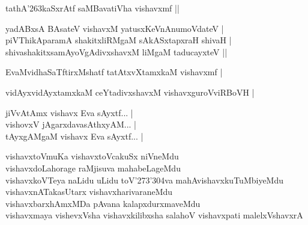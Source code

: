 \begin{entry}
\begin{shl}
tathA{\char'263}kaSxrAtf saMBavatiVha vishavxmf ||
\end{shl}
\begin{shl}
yadABxsA BAsateV vishavxM yatusxKeVnAnumoVdateV |\\
piVThikAparamA shakitxliRMgaM sAkASxtapxraH shivaH |\\
shivashakitxsamAyoVgAdivxshavxM liMgaM taducayxteV ||
\end{shl}
\begin{shl}
EvaMvidhaSaTftirxMshatf tatAtxvXtamxkaM vishavxmf |
\end{shl}
\begin{shl}
vidAyxvidAyxtamxkaM ceYtadivxshavxM vishavxguroVviRBoVH |
\end{shl}
\end{entry}

\begin{entry}
\begin{shl}
jiVvAtAmx vishavx Eva sAyxtf... |\\
vishovxV jAgarxdavasAthxyAM... |\\
tAyxgAMgaM vishavx Eva sAyxtf... |
\end{shl}
\end{entry}

\begin{entry}
\gl{}
\begin{shl}
vishavxtoVmuKa vishavxtoVcakuSx niVneMdu\\
vishavxdoLahorage raMjisuva mahabeLageMdu\\
vishavxkoVTeya naLidu uLidu toV\char'273\char'304va
mahAvishavxkuTuMbiyeMdu\\
vishavxnATakasUtarx vishavxharivaraneMdu\\
vishavxbarxhAmxMDa pAvana kalapxdurxmaveMdu\\
vishavxmaya vishevxVsha vishavxkilibxsha salahoV vishavxpati malelxVshavxrA
\end{shl}
\end{entry}

